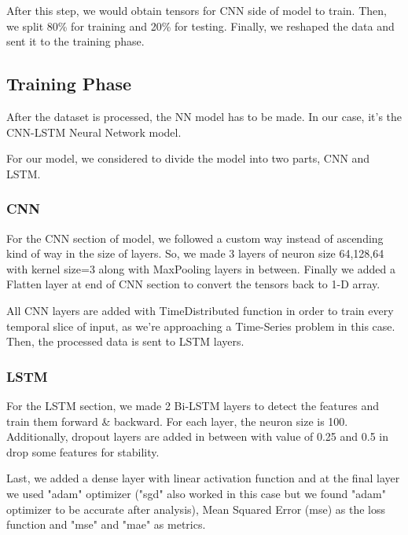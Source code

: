 \documentclass[conference]{IEEEtran}
\begin{document}
After this step, we would obtain tensors for CNN side of model to train. Then, we split 80\% for training and 20\% for testing. Finally, we reshaped the data and sent it to the training phase. 

\subsection{Training Phase}\label{B}
After the dataset is processed, the NN model has to be made. In our case, it's the CNN-LSTM Neural Network model. 

For our model, we considered to divide the model into two parts, CNN and LSTM.

\subsubsection{CNN}
For the CNN section of model, we followed a custom way instead of ascending kind of way in the size of layers. So, we made 3 layers of neuron size 64,128,64 with kernel size=3 along with MaxPooling layers in between. Finally we added a Flatten layer at end of CNN section to convert the tensors back to 1-D array.

All CNN layers are added with TimeDistributed function in order to train every temporal slice of input, as we're approaching a Time-Series problem in this case. Then, the processed data is sent to LSTM layers.

\subsubsection{LSTM}
For the LSTM section, we made 2 Bi-LSTM layers to detect the features and train them forward \& backward. For each layer, the neuron size is 100. Additionally, dropout layers are added in between with value of 0.25 and 0.5 in drop some features for stability.

Last, we added a dense layer with linear activation function and at the final layer we used "adam" optimizer ("sgd" also worked in this case but we found "adam" optimizer to be accurate after analysis), Mean Squared Error (mse) as the loss function and "mse" and "mae" as metrics.
\end{document}
